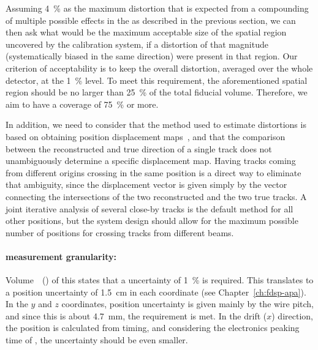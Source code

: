 Assuming \SI{4}{\%} as the maximum \efield distortion %
that is %
expected from a compounding of multiple possible effects in the   %
as described in the previous section,
we can then ask what would be the maximum acceptable size of the spatial region uncovered by the calibration system, if a distortion of that magnitude (systematically biased in the same direction) were present in that region. Our criterion of acceptability is to keep the overall \efield distortion, averaged over the whole detector, at the \SI{1}{\%} level. 
To meet this requirement, the aforementioned spatial region should be no larger than \SI{25}{\%} of the total fiducial volume. Therefore, we aim to have a coverage of \SI{75}{\%} or more.

In addition, we need to consider that the method used to estimate \efield distortions is based on obtaining position displacement maps~\cite{bib:uBlaser2019}, and that the comparison between the reconstructed and true direction of a single track does not %
unambiguously determine a specific displacement map. Having tracks coming from different origins crossing in the same position is a direct way to eliminate that ambiguity, since the displacement vector is given simply by the vector connecting the intersections of the two reconstructed and the two true tracks. A joint iterative analysis of several close-by tracks is the default method for all other positions, but the system design should allow for the maximum possible number of positions %
for crossing tracks from different beams.

\paragraph{\efield measurement granularity:}

Volume~\volnumberphysics~(\voltitlephysics) of this  states that a  uncertainty of \SI{1}{\%} is required. 
This translates to a position uncertainty of \SI{1.5}{\cm} in each coordinate (see Chapter~\ref{ch:fdsp-apa}). 
In the $y$ and $z$ coordinates, position uncertainty is given mainly by the  wire pitch, and since this is about \SI{4.7}{\mm}, the requirement is met. In the drift ($x$) direction, the position is calculated from timing, and considering the electronics peaking time of \fepeaktime, the uncertainty should be even smaller.

